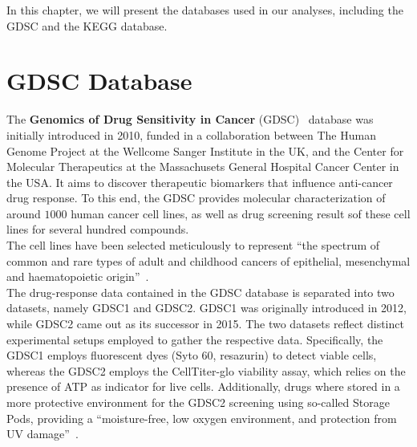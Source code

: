 
In this chapter, we will present the databases used in our analyses, including the GDSC and the KEGG database.

\section{GDSC Database}\label{sec:gdsc}

The \textbf{Genomics of Drug Sensitivity in Cancer} (GDSC)~\cite{gdsc} database was initially introduced in 2010, funded in a collaboration between The Human Genome Project at the Wellcome Sanger Institute in the UK, and the Center for Molecular Therapeutics at the Massachusets General Hospital Cancer Center in the USA.\@
It aims to discover therapeutic biomarkers that influence anti-cancer drug response. To this end, the GDSC provides molecular characterization of around $1000$ human cancer cell lines, as well as drug screening result sof these cell lines for several hundred compounds.\\
The cell lines have been selected meticulously to represent ``the spectrum of common and rare types of adult and childhood cancers of epithelial, mesenchymal and haematopoietic origin''~\cite{gdsc_paper}.\\
The drug-response data contained in the GDSC database is separated into two datasets, namely GDSC1 and GDSC2. GDSC1 was originally introduced in 2012, while GDSC2 came out as its successor in 2015. The two datasets reflect distinct experimental setups employed to gather the respective data. Specifically, the GDSC1 employs fluorescent dyes (Syto 60, resazurin) to detect viable cells, whereas the GDSC2 employs the CellTiter-glo viability assay\cite{celltiterglo}, which relies on the presence of ATP as indicator for live cells. Additionally, drugs where stored in a more protective environment for the GDSC2 screening using so-called Storage Pods, providing a ``moisture-free, low oxygen environment, and protection from UV damage''~\cite{gdsc}.
